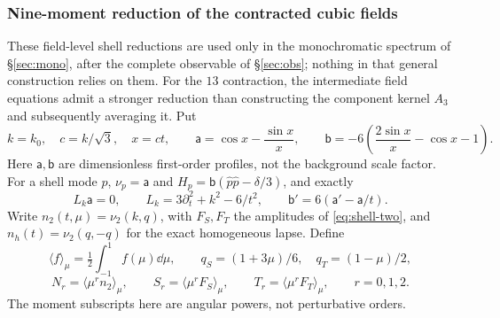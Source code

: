\subsubsection{Nine-moment reduction of the contracted cubic fields}\label{sec:cubic-moments}
These field-level shell reductions are used only in the monochromatic spectrum of
\S\ref{sec:mono}, after the complete observable of \S\ref{sec:obs}; nothing in that general
construction relies on them. For the $13$ contraction, the intermediate field equations admit a stronger reduction than
constructing the component kernel $A_3$ and subsequently averaging it. Put
\[
 k=k_0,\quad c=k/\sqrt3,\quad x=ct,\qquad
 \mathsf a=\cos x-\frac{\sin x}{x},\qquad
 \mathsf b=-6\left(\frac{2\sin x}{x}-\cos x-1\right).
\]
Here $\mathsf a,\mathsf b$ are dimensionless first-order profiles, not the background scale
factor. For a shell mode $p$, $\nu_p=\mathsf a$ and
$H_p=\mathsf b(\hat p\hat p-\delta/3)$, and exactly
\begin{equation}\label{eq:cubic-profile-identities}
 L_k\mathsf a=0,\qquad L_k=3\partial_t^2+k^2-6/t^2,\qquad
 \mathsf b'=6(\mathsf a'-\mathsf a/t).
\end{equation}
Write $n_2(t,\mu)=\nu_2(k,q)$, with $F_S,F_T$ the amplitudes of \eqref{eq:shell-two}, and
$n_h(t)=\nu_2(q,-q)$ for the exact homogeneous lapse. Define
\[
 \langle f\rangle_\mu=\tfrac12\int_{-1}^1f(\mu)\dd\mu,\qquad
 q_S=(1+3\mu)/6,\quad q_T=(1-\mu)/2,
\]
\[
 N_r=\langle\mu^r n_2\rangle_\mu,\qquad
 S_r=\langle\mu^r F_S\rangle_\mu,\qquad
 T_r=\langle\mu^r F_T\rangle_\mu,\qquad r=0,1,2.
\]
The moment subscripts here are angular powers, not perturbative orders.

